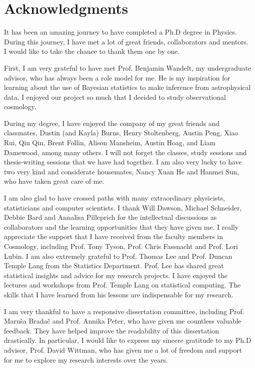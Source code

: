 \section*{Acknowledgments} 

It has been an amazing journey to have completed a Ph.D degree in Physics. 
During this journey, I have met a lot of great friends, collaborators and
mentors. I would like to take the chance to thank them one by one.  

First, I am very grateful to have met Prof. Benjamin Wandelt,  
my undergraduate advisor, who has always been a role model for me. 
He is my inspiration for learning about the use of Bayesian statistics 
to make inference from astrophysical data. I enjoyed our project so much that I   
decided to study observational cosmology.  

During my degree, I have enjoyed the company of my great friends and classmates, Dustin (and Kayla) 
Burns, Henry Stoltenberg, Austin Peng, Xiao Rui, Qin Qin, 
Brent Follin, Alison Mansheim, 
Austin Hoag, and Liam Damewood, among many others. I will not forget the
classes, study sessions and thesis-writing sessions 
that we have had together.
I am also very lucky to have two very kind and considerate housemates, Nancy Xuan He
and Hanmei Sun, who have taken great care of me.  
 
I am also glad to have crossed paths with many 
extraordinary physicists, statisticians and computer scientists. 
I thank Will Dawson, Michael Schneider, Debbie Bard and Annalisa Pilleprich for the intellectual
discussions as collaborators and the learning opportunities that they have
given me. 
I really appreciate the support that I have received from the
faculty members in Cosmology, including Prof. Tony Tyson, 
Prof. Chris Fassnacht and Prof. Lori Lubin. 
I am also extremely grateful to Prof. Thomas Lee and Prof. Duncan Temple Lang from the
Statistics Department. Prof. Lee has shared great statistical insights and 
advice for my research projects. I have enjoyed the lectures and workshops 
from Prof. Temple Lang on statistical computing. The skills that I have learned
from his lessons are indispensable for my research. 
 
I am very thankful to have a responsive dissertation committee, including
Prof. Maru\v{s}a Brada\v{c} and Prof. Annika Peter, who have given me 
countless valuable feedback. They have helped improve the
readability of this dissertation drastically.  
In particular, I would like to express my sincere gratitude to my Ph.D advisor,
Prof. David Wittman, who has given me a lot of freedom and support for 
me to explore my research interests over the years. 

